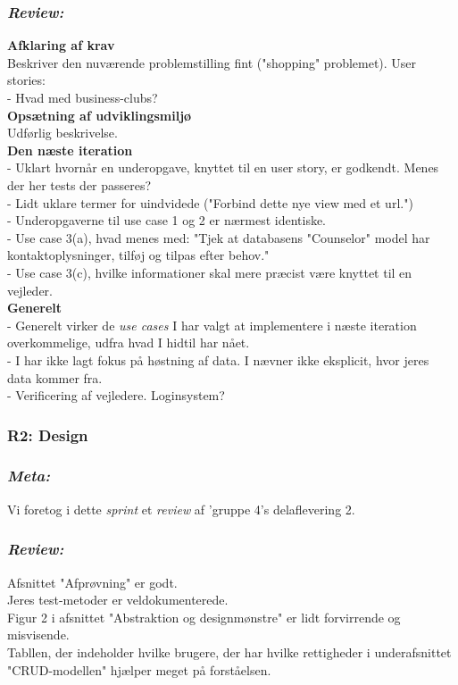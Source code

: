 \documentclass[12pt]{article}
\begin{document}
\subsubsection*{\textit{Review:}}
\textbf{Afklaring af krav} \\
Beskriver den nuværende problemstilling fint ("shopping" problemet).
User stories: \\
- Hvad med business-clubs?\\
\textbf{Opsætning af udviklingsmiljø} \\
Udførlig beskrivelse.\\
\textbf{Den næste iteration} \\
- Uklart hvornår en underopgave, knyttet til en user story, er godkendt. Menes der her tests der passeres? \\
- Lidt uklare termer for uindvidede ("Forbind dette nye view med et url.") \\
- Underopgaverne til use case 1 og 2 er nærmest identiske. \\
- Use case 3(a), hvad menes med: "Tjek at databasens "Counselor" model har \\ kontaktoplysninger, tilføj og tilpas efter behov." \\
- Use case 3(c), hvilke informationer skal mere præcist være knyttet til en vejleder.\\
\textbf{Generelt} \\
- Generelt virker de \textit{use cases} I har valgt at implementere i næste iteration overkommelige, udfra hvad I hidtil har nået. \\
- I har ikke lagt fokus på høstning af data. I nævner ikke eksplicit, hvor jeres data kommer fra. \\
- Verificering af vejledere. Loginsystem?

\subsubsection{R2: Design}
\subsubsection*{\textit{Meta:}}
Vi foretog i dette \textit{sprint} et \textit{review} af 'gruppe 4's delaflevering 2.

\subsubsection*{\textit{Review:}}
Afsnittet "Afprøvning" er godt. \\
Jeres test-metoder er veldokumenterede. \\
Figur 2 i afsnittet "Abstraktion og designmønstre" er lidt forvirrende og misvisende. \\
Tabllen, der indeholder hvilke brugere, der har hvilke rettigheder i underafsnittet "CRUD-modellen" hjælper meget på forståelsen.
\end{document}
